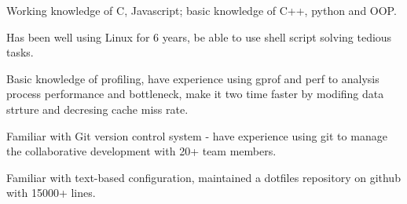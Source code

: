 

\begin{cventries}

\begin{cvitems_skill}
    \item Working knowledge of C, Javascript; basic knowledge of C++, python and OOP.
    \item Has been well using Linux for 6 years, be able to use shell script solving tedious tasks. 
    \item Basic knowledge of profiling, have experience using gprof and perf to analysis process performance and bottleneck, make it two time faster by modifing data strture and decresing cache miss rate.
    \item Familiar with Git version control system - have experience using git to manage the collaborative development with 20+ team members.
    \item Familiar with text-based configuration, maintained a dotfiles repository on github with 15000+ lines.
    \end{cvitems_skill}

\end{cventries}
